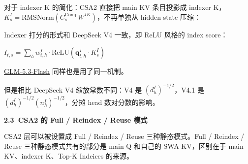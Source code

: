 \documentclass[zihao=false,fontset=windows]{ctexart}
\newcommand{\bigmath}[1]{%
  \begin{center}\large$\displaystyle #1$\end{center}%
}
\begin{document}

对于 indexer K 的简化：CSA2 直接把 main KV 条目投影成 indexer K，$K_s^I=\mathrm{RMSNorm}(C_s^{\mathrm{Comp}}W^{IK})$，不再单独从 hidden state 压缩：\par


Indexer 打分的形式和 DeepSeek V4 一致，即 ReLU 风格的 index score：\par

\bigmath{I_{t,s}=\sum_h w_{t,h}^I\cdot\mathrm{ReLU}(\mathbf{q}_{t,h}^I\cdot K_s^I)}

\begin{feishuquote}

\href{https://scnajei2ds6y.feishu.cn/wiki/KOBowKTbgiv6ewkHhEBc6qCNnPe}{GLM-5.3-Flash} 同样也是用了同一机制。\par
\end{feishuquote}

但是相比 DeepSeek V4 缩放常数不同：V4 是 $(d_h^I)^{-1/2}$，V4.1 是 $(d_h^I)^{-1/2}(n_h^I)^{-1/2}$，分摊 head 数对分数的影响。\par


\par{}\vspace{0.8em}\noindent \begin{tcolorbox}[boxrule=0pt,arc=3pt,colback=callOrange,left=3pt,right=3pt,top=2pt,bottom=2pt,before skip=0pt,after skip=0pt]{\bfseries \textcolor{feishuBlue}{2.3}\ CSA2 的 Full / Reindex / Reuse 模式}\end{tcolorbox}\par\vspace{0.28em}

CSA2 层可以被设置成 Full / Reindex / Reuse 三种静态模式。Full / Reindex / Reuse 三种静态模式共有的部分是 main Q 和自己的 SWA KV，区别在于 main KV、indexer K、Top-K Indeices 的来源。\par
\end{document}
